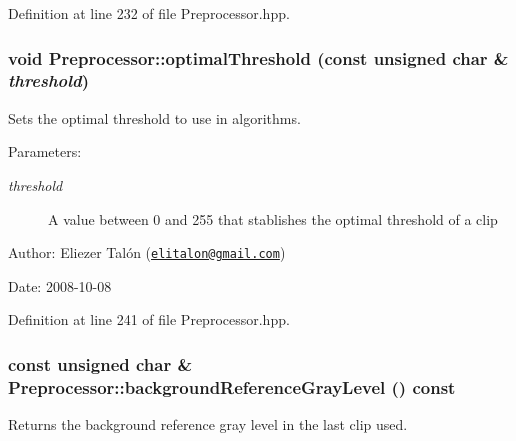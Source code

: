 Definition at line 232 of file Preprocessor.hpp.\hypertarget{class_preprocessor_1fc44d7d19944f3c3addd3a576c37414}{
\subsubsection[optimalThreshold]{\setlength{\rightskip}{0pt plus 5cm}void Preprocessor::optimalThreshold (const unsigned char \& {\em threshold})}}
\label{class_preprocessor_1fc44d7d19944f3c3addd3a576c37414}


Sets the optimal threshold to use in algorithms. 

\begin{Desc}
\item[Parameters:]
\begin{description}
\item[{\em threshold}]A value between 0 and 255 that stablishes the optimal threshold of a clip\end{description}
\end{Desc}
\begin{Desc}
\item[Author:]Eliezer Talón (\href{mailto:elitalon@gmail.com}{\tt elitalon@gmail.com}) \end{Desc}
\begin{Desc}
\item[Date:]2008-10-08 \end{Desc}


Definition at line 241 of file Preprocessor.hpp.\hypertarget{class_preprocessor_b435116619b7b254d9e788476c012e8a}{
\subsubsection[backgroundReferenceGrayLevel]{\setlength{\rightskip}{0pt plus 5cm}const unsigned char \& Preprocessor::backgroundReferenceGrayLevel () const}}
\label{class_preprocessor_b435116619b7b254d9e788476c012e8a}


Returns the background reference gray level in the last clip used. 

